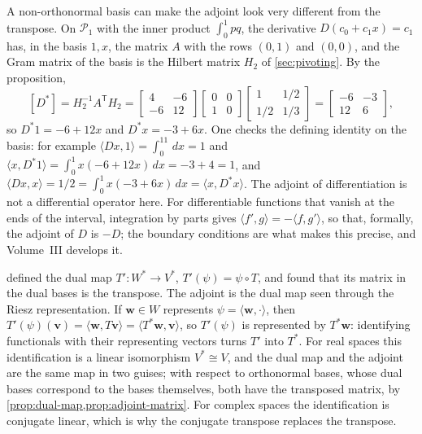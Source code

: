 A non-orthonormal basis can make the adjoint look very different from the transpose. On $\mathcal P_1$ with the inner product $\int_0^1pq$, the derivative $D(c_0+c_1x)=c_1$ has, in the basis $1,x$, the matrix $A$ with the rows $(0,1)$ and $(0,0)$, and the Gram matrix of the basis is the Hilbert matrix $H_2$ of \cref{sec:pivoting}. By the proposition,
\[
[D^*]=H_2^{-1}A^{\mathsf T}H_2=\begin{bmatrix}4&-6\\-6&12\end{bmatrix}\begin{bmatrix}0&0\\1&0\end{bmatrix}\begin{bmatrix}1&1/2\\1/2&1/3\end{bmatrix}=\begin{bmatrix}-6&-3\\12&6\end{bmatrix},
\]
so $D^*1=-6+12x$ and $D^*x=-3+6x$. One checks the defining identity on the basis: for example $\langle Dx,1\rangle=\int_0^11\,dx=1$ and $\langle x,D^*1\rangle=\int_0^1x(-6+12x)\,dx=-3+4=1$, and $\langle Dx,x\rangle=1/2=\int_0^1x(-3+6x)\,dx=\langle x,D^*x\rangle$. The adjoint of differentiation is not a differential operator here. For differentiable functions that vanish at the ends of the interval, integration by parts gives $\langle f',g\rangle=-\langle f,g'\rangle$, so that, formally, the adjoint of $D$ is $-D$; the boundary conditions are what makes this precise, and Volume~III develops it.

 defined the dual map $T'\colon W^*\to V^*$, $T'(\psi)=\psi\circ T$, and found that its matrix in the dual bases is the transpose. The adjoint is the dual map seen through the Riesz representation. If $\mathbf w\in W$ represents $\psi=\langle\mathbf w,\cdot\rangle$, then $T'(\psi)(\mathbf v)=\langle\mathbf w,T\mathbf v\rangle=\langle T^*\mathbf w,\mathbf v\rangle$, so $T'(\psi)$ is represented by $T^*\mathbf w$: identifying functionals with their representing vectors turns $T'$ into $T^*$. For real spaces this identification is a linear isomorphism $V^*\cong V$, and the dual map and the adjoint are the same map in two guises; with respect to orthonormal bases, whose dual bases correspond to the bases themselves, both have the transposed matrix, by \cref{prop:dual-map,prop:adjoint-matrix}. For complex spaces the identification is conjugate linear, which is why the conjugate transpose replaces the transpose.

